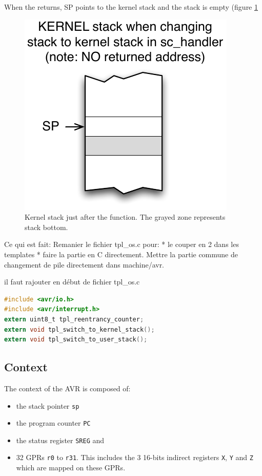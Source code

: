 When the  returns, SP points to the kernel stack and the stack is empty (figure \ref{fig:avr8kernStackInit}
\begin{figure}[htbp] %
\begin{minipage}{0.5\textwidth}
    \centering
  \includegraphics[scale=.6]{pictures/avr8-kernStackInit.pdf} 
\end{minipage}
\begin{minipage}{0.5\textwidth}
   \caption{Kernel stack just after the  function. The grayed zone represents stack bottom.}
   \label{fig:avr8kernStackInit}
\end{minipage}
\end{figure}



Ce qui est fait:
Remanier le fichier tpl_os.c pour:
* le couper en 2 dans les templates
* faire la partie en C directement. Mettre la partie commune de changement de pile directement dans
machine/avr.

il faut rajouter en début de fichier tpl_os.c
\begin{lstlisting}[language=C]
#include <avr/io.h>
#include <avr/interrupt.h>
extern uint8_t tpl_reentrancy_counter;
extern void tpl_switch_to_kernel_stack();
extern void tpl_switch_to_user_stack();
\end{lstlisting}




\subsection{Context}
The context of the AVR is composed of:
\begin{itemize}
\item the stack pointer \texttt{sp}
\item the program counter \texttt{PC}
\item the status register \texttt{SREG} and 
\item 32 GPRs \texttt{r0} to \texttt{r31}. This includes the 3 16-bits indirect registers \texttt{X}, \texttt{Y} and \texttt{Z} which are mapped on these GPRs.
\end{itemize}

